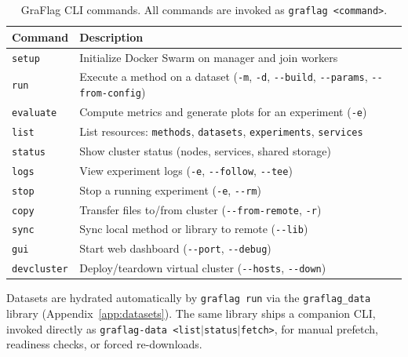 \documentclass[twoside,11pt]{article}
\begin{document}
\begin{table}[h]
\centering
\caption{GraFlag CLI commands. All commands are invoked as \texttt{graflag <command>}.}
\label{tab:cli}
\footnotesize
\begin{tabular}{@{}lp{6cm}@{}}
\toprule
\textbf{Command} & \textbf{Description} \\
\midrule
\texttt{setup}      & Initialize Docker Swarm on manager and join workers \\
\texttt{run}        & Execute a method on a dataset (\texttt{-m}, \texttt{-d}, \texttt{-{}-build}, \texttt{-{}-params}, \texttt{-{}-from-config}) \\
\texttt{evaluate}   & Compute metrics and generate plots for an experiment (\texttt{-e}) \\
\texttt{list}       & List resources: \texttt{methods}, \texttt{datasets}, \texttt{experiments}, \texttt{services} \\
\texttt{status}     & Show cluster status (nodes, services, shared storage) \\
\texttt{logs}       & View experiment logs (\texttt{-e}, \texttt{-{}-follow}, \texttt{-{}-tee}) \\
\texttt{stop}       & Stop a running experiment (\texttt{-e}, \texttt{-{}-rm}) \\
\texttt{copy}       & Transfer files to/from cluster (\texttt{-{}-from-remote}, \texttt{-r}) \\
\texttt{sync}       & Sync local method or library to remote (\texttt{-{}-lib}) \\
\texttt{gui}        & Start web dashboard (\texttt{-{}-port}, \texttt{-{}-debug}) \\
\texttt{devcluster} & Deploy/teardown virtual cluster (\texttt{-{}-hosts}, \texttt{-{}-down}) \\
\bottomrule
\end{tabular}
\end{table}

Datasets are hydrated automatically by \texttt{graflag run} via the \texttt{graflag\_data} library (Appendix~\ref{app:datasets}). The same library ships a companion CLI, invoked directly as \texttt{graflag-data <list$|$status$|$fetch>}, for manual prefetch, readiness checks, or forced re-downloads.
\end{document}
